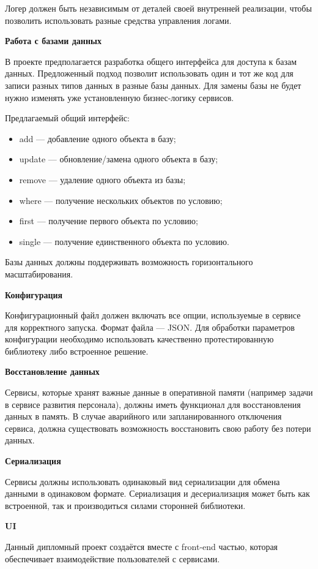 Логер должен быть независимым от деталей своей внутренней реализации, чтобы позволить использовать разные средства управления логами.

\bigskip
\textbf{Работа с базами данных}

В проекте предполагается разработка общего интерфейса для доступа к базам данных. Предложенный подход позволит использовать один и тот же код для записи разных типов данных в разные базы данных. Для замены базы не будет нужно изменять уже установленную бизнес-логику сервисов.

Предлагаемый общий интерфейс:
\begin{itemize}
	\item add — добавление одного объекта в базу;
	\item update — обновление/замена одного объекта в базу;
	\item remove — удаление одного объекта из базы;
	\item where — получение нескольких объектов по условию;
	\item first — получение первого объекта по условию;
	\item single — получение единственного объекта по условию.
\end{itemize}

Базы данных должны поддерживать возможность горизонтального масштабирования.

\bigskip
\textbf{Конфигурация}

Конфигурационный файл должен включать все опции, используемые в сервисе для корректного запуска. Формат файла — JSON. Для обработки параметров конфигурации необходимо использовать качественно протестированную библиотеку либо встроенное решение.

\bigskip
\textbf{Восстановление данных}

Сервисы, которые хранят важные данные в оперативной памяти (например задачи в сервисе развития персонала), должны иметь функционал для восстановления данных в память. В случае аварийного или запланированного отключения сервиса, должна существовать возможность восстановить свою работу без потери данных.

\bigskip
\textbf{Сериализация}

Сервисы должны использовать одинаковый вид сериализации для обмена данными в одинаковом формате. Сериализация и десериализация может быть как встроенной, так и производиться силами сторонней библиотеки.

\bigskip
\textbf{UI}

Данный дипломный проект создаётся вместе с front-end частью, которая обеспечивает взаимодействие пользователей с сервисами.


